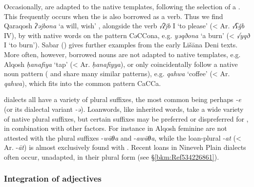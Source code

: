 \documentclass[output=paper]{langsci/langscibook}
\begin{document}
Occasionally,  are adapted to the native  templates, following the selection of a . This frequently occurs when the  is also borrowed as a verb. Thus we find  Qaraqosh \textit{ʔəjbona} ‘a will, wish’ \citep[517]{Khan2002}, alongside the verb \textit{√ʔjb} I ‘to please’ (< Ar. \textit{√ʕǧb} IV), by  with native words on the pattern CəCCona, e.g. \textit{yəqðona} ‘a burn’ (< \textit{√yqð} I ‘to burn’). Sabar (\citeyear[205]{Sabar1984}) gives further examples from the early Lišāna Deni texts. More often, however, borrowed nouns are not adapted to native templates, e.g. Alqosh \textit{ḥanafiya} ‘tap’ (< Ar. \textit{ḥanafiyya}), or only coincidentally follow a native noun pattern ( and  share many similar patterns), e.g. \textit{qahwa} ‘coffee’ (< Ar. \textit{qahwa}), which fits into the common  pattern CaCCa.

 dialects all have a variety of plural suffixes, the most common being perhaps \textit{\nobreakdash-e} (or its dialectal variant \textit{\nobreakdash-ə}). Loanwords, like inherited words, take a wide variety of native plural suffixes, but certain suffixes may be preferred or dispreferred for , in combination with other factors. For instance in  Alqosh feminine  are not attested with the  plural suffixes \nobreakdash-\textit{wāθa} and \nobreakdash-\textit{awāθa}, while the loan-plural \nobreakdash-\textit{at} (< Ar. \nobreakdash-\textit{āt}) is almost exclusively found with  \citep[347]{Coghill2005}. Recent  loans in  Nineveh Plain dialects often occur, unadapted, in their  plural form (see §\ref{bkm:Ref534226861}).

\subsubsection{Integration of adjectives}
\end{document}
